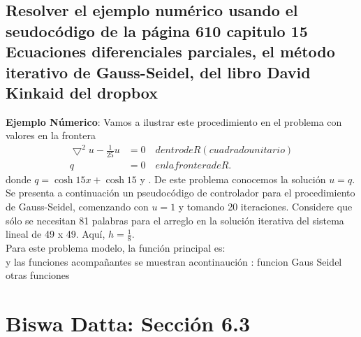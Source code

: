 \documentclass[12pt]{article}
\begin{document}



\subsection{Resolver el ejemplo numérico usando el seudocódigo de la página 610 capitulo 15
Ecuaciones diferenciales parciales, el método iterativo de Gauss-Seidel, del libro David
Kinkaid del dropbox}
\textbf{Ejemplo Númerico}: Vamos a ilustrar este procedimiento en el problema con valores en la frontera
\begin{align*}
    \bigtriangledown^2u-\frac{1}{25}u &= 0 \quad dentro de R (cuadrado unitario) \\
    q &= 0 \quad en la frontera de R.
\end{align*}
    donde $q = \cosh 15 x + \cosh 15$ y . De este problema conocemos la solución $u = q$. Se presenta a
continuación un pseudocódigo de controlador para el procedimiento de Gauss-Seidel, comenzando
con $u = 1$ y tomando 20 iteraciones. Considere que sólo se necesitan 81 palabras para el arreglo en
la solución iterativa del sistema lineal de 49 x 49. Aquí, $h = \frac{1}{8}$.
\\
Para este problema modelo, la función principal es:
\\


y las funciones acompañantes se muestran acontinaución :
funcion Gaus Seidel\\


otras funciones\\












% 
\section{Biswa Datta: Sección 6.3}
\end{document}
